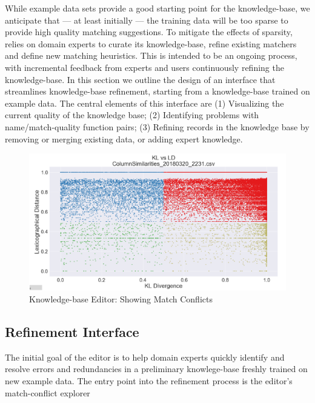 
While example data sets provide a good starting point for the \systemname knowledge-base, we anticipate that --- at least initially --- the training data will be too sparse to provide high quality matching suggestions.
To mitigate the effects of sparsity, \systemname relies on domain experts to curate its knowledge-base, refine existing matchers and define new matching heuristics.
This is intended to be an ongoing process, with incremental feedback from experts and users continuously refining the knowledge-base.
In this section we outline the design of an interface that streamlines knowledge-base refinement, starting from a knowledge-base trained on example data.
The central elements of this interface are 
(1) Visualizing the current quality of the knowledge base;
(2) Identifying problems with name/match-quality function pairs;
(3) Refining records in the knowledge base by removing or merging existing data, or adding expert knowledge.

\begin{figure}
	\centering
	\includegraphics[width=1\columnwidth]{graphics/KBUI}
	\caption{Knowledge-base Editor: Showing Match Conflicts}
	\label{fig:editor:scatterplot}
	\trimfigurespacing
\end{figure}

\subsection{Refinement Interface}
The initial goal of the \systemname editor is to help domain experts quickly identify and resolve errors and redundancies in a preliminary knowlege-base freshly trained on new example data.  
The entry point into the refinement process is the \systemname editor's match-conflict explorer


